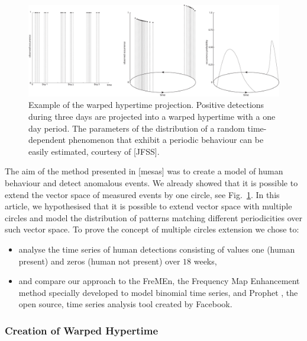 \begin{figure}[!t]
\begin{center}
    \includegraphics[width=1.0\columnwidth]{fig/hypertime_graph}
    \caption{Example of the warped hypertime projection. Positive detections during three days are projected into a warped hypertime with a one day period. The parameters of the distribution of a random time-dependent phenomenon that exhibit a periodic behaviour can be easily estimated, courtesy of [JFSS].\label{fig:hypertime}}

\end{center}
\end{figure}



The aim of the method presented in [mesas] was to create a model of human behaviour and detect anomalous events. 
We already showed that it is possible to extend the vector space of measured events by one circle, see Fig.~\ref{fig:hypertime}.
In this article, we hypothesised that it is possible to extend vector space with multiple circles and model the distribution of patterns matching different periodicities over such vector space.
To prove the concept of multiple circles extension we chose to: 
\begin{itemize}
    \item analyse the time series of human detections consisting of values one (human present) and zeros (human not present) over $18$ weeks, 
    \item and compare our approach to the FreMEn, the Frequency Map Enhancement method \cite{krajnik2017fremen} specially developed to model binomial time series, and Prophet \cite{taylor2018forecasting}, the open source, time series analysis tool created by Facebook.
\end{itemize}

\subsubsection{Creation of Warped Hypertime}\label{sec:whyte}

